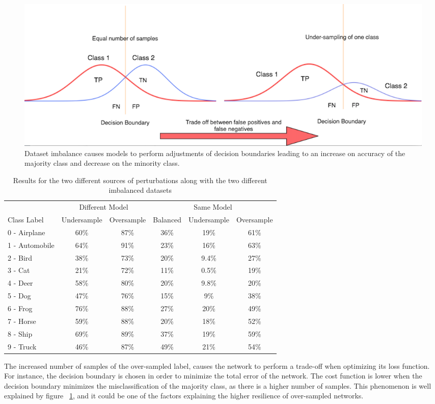 \begin{figure}
	\centering
	\includegraphics[scale=0.32]{class_dist.png}
	\caption{Dataset imbalance causes models to perform adjustments of decision boundaries leading to an increase on accuracy of the majority class and decrease on the minority class.}
	\label{fig:class_dist}
\end{figure}

\begin{table}
	\centering
	
	\begin{tabular}{lccccc}
		\toprule
		&\multicolumn{2}{c}{Different Model}
		&\multicolumn{3}{c}{Same Model}
		\\\cmidrule(r){2-3}\cmidrule(l){4-6}
		Class Label &Undersample &Oversample &Balanced &Undersample &Oversample \\
		\midrule
		0 - Airplane &60\%& 87\% &36\%& 19\%    & 61\% \\
		1 - Automobile &64\%& 91\% &23\%& 16\%    & 63\% \\
		2 - Bird &38\%& 73\% &20\%& 9.4\%    & 27\% \\
		3 - Cat &21\%& 72\% &11\%& 0.5\%    & 19\% \\
		4 - Deer &58\%& 80\% &20\%& 9.8\%    & 20\% \\
		5 - Dog &47\%& 76\% &15\%& 9\%    & 38\% \\
		6 - Frog &76\%& 88\% &27\%& 20\%    & 49\% \\
		7 - Horse &59\%& 88\% &20\%& 18\%    & 52\% \\
		8 - Ship &69\%& 89\% &37\%& 19\%    & 59\% \\
		9 - Truck &46\%& 87\% &49\%& 21\%    & 54\% \\
		\bottomrule
	\end{tabular}
	\caption{Results for the two different sources of perturbations along with the two different imbalanced datasets}
	\label{tbl:results}
\end{table}
The increased number of samples of the over-sampled label, causes the network to perform a trade-off when optimizing its loss function. For instance, the decision boundary is chosen in order to minimize the total error of the network. The cost function is lower when the decision boundary minimizes the misclassification of the majority class, as there is a higher number of samples. This phenomenon is well explained by figure ~\ref{fig:class_dist}, and it could be one of the factors explaining the higher resilience of over-sampled networks.

